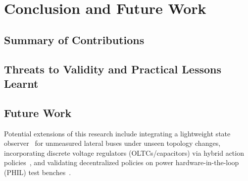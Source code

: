 \chapter{Conclusion and Future Work}
\label{ch:conclusion}

\section{Summary of Contributions}

\section{Threats to Validity and Practical Lessons Learnt}

\section{Future Work}
Potential extensions of this research include integrating a lightweight state observer~\cite{Simon2006} for unmeasured lateral buses under unseen topology changes, incorporating discrete voltage regulators (OLTCs/capacitors) via hybrid action policies~\cite{Wang2026}, and validating decentralized policies on power hardware-in-the-loop (PHIL) test benches~\cite{Ortmann2020}.
